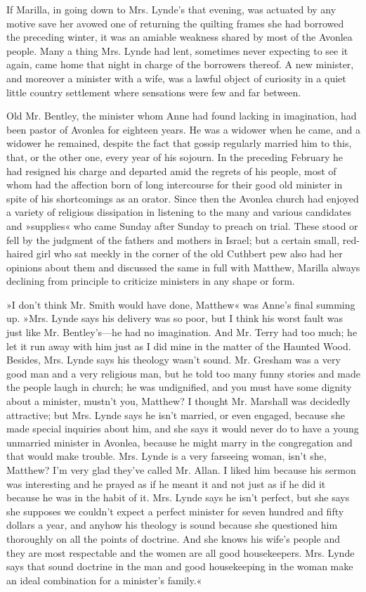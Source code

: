 If Marilla, in going down to Mrs. Lynde’s that evening, was actuated by any motive save her avowed one of returning the quilting frames she had borrowed the preceding winter, it was an amiable weakness shared by most of the Avonlea people. Many a thing Mrs. Lynde had lent, sometimes never expecting to see it again, came home that night in charge of the borrowers thereof. A new minister, and moreover a minister with a wife, was a lawful object of curiosity in a quiet little country settlement where sensations were few and far between.

Old Mr. Bentley, the minister whom Anne had found lacking in imagination, had been pastor of Avonlea for eighteen years. He was a widower when he came, and a widower he remained, despite the fact that gossip regularly married him to this, that, or the other one, every year of his sojourn. In the preceding February he had resigned his charge and departed amid the regrets of his people, most of whom had the affection born of long intercourse for their good old minister in spite of his shortcomings as an orator. Since then the Avonlea church had enjoyed a variety of religious dissipation in listening to the many and various candidates and »supplies« who came Sunday after Sunday to preach on trial. These stood or fell by the judgment of the fathers and mothers in Israel; but a certain small, red-haired girl who sat meekly in the corner of the old Cuthbert pew also had her opinions about them and discussed the same in full with Matthew, Marilla always declining from principle to criticize ministers in any shape or form.

»I don’t think Mr. Smith would have done, Matthew« was Anne’s final summing up. »Mrs. Lynde says his delivery was so poor, but I think his worst fault was just like Mr. Bentley’s—he had no imagination. And Mr. Terry had too much; he let it run away with him just as I did mine in the matter of the Haunted Wood. Besides, Mrs. Lynde says his theology wasn’t sound. Mr. Gresham was a very good man and a very religious man, but he told too many funny stories and made the people laugh in church; he was undignified, and you must have some dignity about a minister, mustn’t you, Matthew? I thought Mr. Marshall was decidedly attractive; but Mrs. Lynde says he isn’t married, or even engaged, because she made special inquiries about him, and she says it would never do to have a young unmarried minister in Avonlea, because he might marry in the congregation and that would make trouble. Mrs. Lynde is a very farseeing woman, isn’t she, Matthew? I’m very glad they’ve called Mr. Allan. I liked him because his sermon was interesting and he prayed as if he meant it and not just as if he did it because he was in the habit of it. Mrs. Lynde says he isn’t perfect, but she says she supposes we couldn’t expect a perfect minister for seven hundred and fifty dollars a year, and anyhow his theology is sound because she questioned him thoroughly on all the points of doctrine. And she knows his wife’s people and they are most respectable and the women are all good housekeepers. Mrs. Lynde says that sound doctrine in the man and good housekeeping in the woman make an ideal combination for a minister’s family.«

